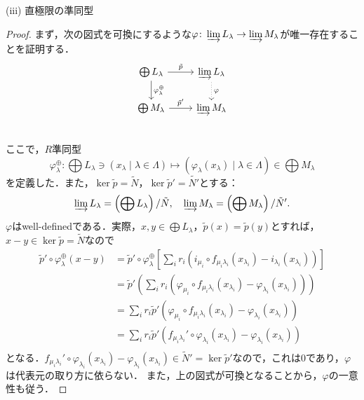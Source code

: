 \begin{screen}
  (iii) 直極限の準同型
\end{screen}
\begin{proof}
  まず，次の図式を可換にするような$\varphi\colon \varinjlim L_\lambda \to \varinjlim M_\lambda$が唯一存在することを証明する．
  \[
  \begin{tikzcd}
    \bigoplus L_\lambda \arrow[r, "\tilde{p}"]\arrow[d, "\varphi_\lambda^\oplus"] & \varinjlim L_\lambda \arrow[d, "\varphi", dotted] \\
    \bigoplus M_\lambda \arrow[r, "\tilde{p}'"] & \varinjlim M_\lambda \\
  \end{tikzcd}
  \]
  ここで，$R$準同型
  \[ \varphi_\lambda^\oplus\colon \bigoplus L_\lambda \ni (x_\lambda \mid \lambda \in \Lambda) \mapsto (\varphi_\lambda(x_\lambda) \mid \lambda \in \Lambda) \in \bigoplus M_\lambda \]
  を定義した．また，$\ker\tilde{p} = \tilde{N}$，$\ker\tilde{p}' = \tilde{N'}$とする：
  \[ \varinjlim L_\lambda = \left( \bigoplus L_\lambda \right) / \tilde{N},\quad \varinjlim M_\lambda = \left( \bigoplus M_\lambda \right) / \tilde{N}'. \]
  $\varphi$はwell-definedである．実際，$x, y \in \bigoplus L_\lambda$，$\tilde{p}(x) = \tilde{p}(y)$とすれば，$x - y \in \ker \tilde{p} = \tilde{N}$なので
  \begin{align*}
    \tilde{p}' \circ \varphi_\lambda^\oplus (x-y) &= \tilde{p}' \circ \varphi_\lambda^\oplus \left[\sum_i r_i \left( i_{\mu_i} \circ f_{\mu_i \lambda_i} (x_{\lambda_i}) - i_{\lambda_i} (x_{\lambda_i}) \right) \right] \\
    &= \tilde{p}' \left(\sum_i r_i \left( \varphi_{\mu_i} \circ f_{\mu_i \lambda_i} (x_{\lambda_i}) - \varphi_{\lambda_i} (x_{\lambda_i}) \right) \right) \\
    &= \sum_i r_i \tilde{p}' \left( \varphi_{\mu_i} \circ f_{\mu_i \lambda_i} (x_{\lambda_i}) - \varphi_{\lambda_i} (x_{\lambda_i}) \right) \\
    &= \sum_i r_i \tilde{p}' \left( f_{\mu_i \lambda_i}' \circ \varphi_{\lambda_i} (x_{\lambda_i}) - \varphi_{\lambda_i} (x_{\lambda_i}) \right) \\
  \end{align*}
  となる．$f_{\mu_i \lambda_i}' \circ \varphi_{\lambda_i} (x_{\lambda_i}) - \varphi_{\lambda_i} (x_{\lambda_i}) \in \tilde{N}' = \ker \tilde{p}'$なので，これは$0$であり，$\varphi$は代表元の取り方に依らない．
  また，上の図式が可換となることから，$\varphi$の一意性も従う．


\end{proof}
